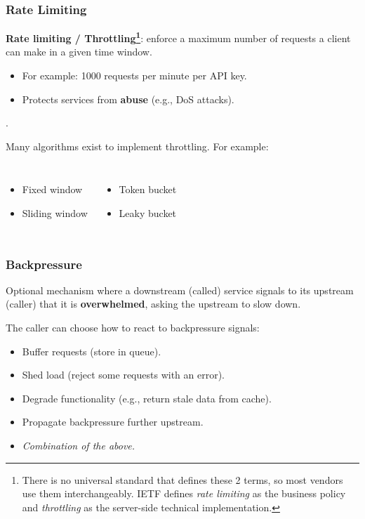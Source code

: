 \documentclass{beamer}
\begin{document}
\begin{frame}
  \frametitle{Rate Limiting}

  \textbf{Rate limiting / Throttling\footnote{There is no universal standard that defines these 2 terms, so most vendors use them interchangeably. IETF defines \textit{rate limiting} as the business policy and \textit{throttling} as the server-side technical implementation.}}: enforce a maximum number of requests a client can make in a given time window.
  \begin{itemize}
    \item For example: 1000 requests per minute per API key.
    \item Protects services from \textbf{abuse} (e.g., DoS attacks).
  \end{itemize}
  {\color{white} . }

  Many algorithms exist to implement throttling. For example:
  \begin{columns}
    \begin{itemize}
      \item Fixed window
      \item Sliding window
    \end{itemize}
    \begin{itemize}
      \item Token bucket
      \item Leaky bucket
    \end{itemize}
  \end{columns}
\end{frame}

\begin{frame}
  \frametitle{Backpressure}

  Optional mechanism where a downstream (called) service signals to its upstream (caller) that it is \textbf{overwhelmed}, asking the upstream to slow down.
  \newline

  The caller can choose how to react to backpressure signals:
  \begin{itemize}
    \item Buffer requests (store in queue).
    \item Shed load (reject some requests with an error).
    \item Degrade functionality (e.g., return stale data from cache).
    \item Propagate backpressure further upstream.
    \item \textit{Combination of the above.}
  \end{itemize}
\end{frame}
\end{document}
